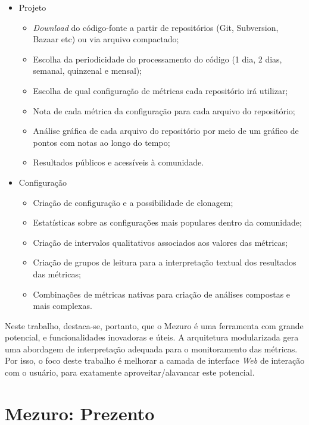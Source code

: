 \begin{itemize}
  \item Projeto
    \begin{itemize}
    \item \textit{Download} do código-fonte a partir de repositórios (Git,
    Subversion, Bazaar etc) ou via arquivo compactado;
        \item Escolha da periodicidade do processamento do código (1 dia, 2 dias,
        semanal, quinzenal e mensal);
        \item Escolha de qual configuração de métricas cada repositório irá
        utilizar;
        \item Nota de cada métrica da configuração para cada arquivo do
        repositório;
        \item Análise gráfica de cada arquivo do repositório por meio de um
        gráfico de pontos com notas ao longo do tempo;
        \item Resultados públicos e acessíveis à comunidade.
    \end{itemize}
    \item Configuração
    \begin{itemize}
    \item Criação de configuração e a possibilidade de clonagem;
        \item Estatísticas sobre as configurações mais populares dentro da
        comunidade;
        \item Criação de intervalos qualitativos associados aos valores das
        métricas;
        \item Criação de grupos de leitura para a interpretação textual dos
        resultados das métricas;
        \item Combinações de métricas nativas para criação de análises compostas
        e mais complexas.
    \end{itemize}
\end{itemize}

Neste trabalho, destaca-se, portanto, que o Mezuro é uma ferramenta
com grande potencial, e funcionalidades inovadoras e úteis. A arquitetura
modularizada gera uma abordagem de interpretação adequada para o monitoramento
das métricas. Por isso, o foco deste trabalho é melhorar a camada de interface
\textit{Web} de interação com o usuário, para exatamente aproveitar/alavancar
este potencial.

\section{Mezuro: Prezento}

